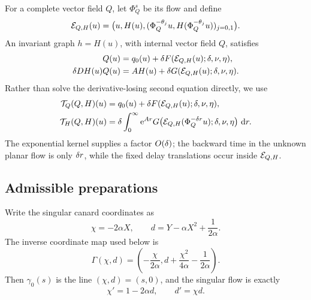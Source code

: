 For a complete vector field \(Q\), let \(\Phi_Q^s\) be its flow and define
\begin{equation}
\label{eq:graph-evaluation}
 \mathcal E_{Q,H}(u)=\bigl(u,H(u),
   (\Phi_Q^{-\theta_j}u,H(\Phi_Q^{-\theta_j}u))_{j=0,1}\bigr).
\end{equation}
An invariant graph \(h=H(u)\), with internal vector field \(Q\), satisfies
\begin{equation}
\label{eq:graph-invariance}
\begin{aligned}
 Q(u)&=q_0(u)+\delta F(\mathcal E_{Q,H}(u);\delta,\nu,\eta),\\
 \delta DH(u)Q(u)&=AH(u)+\delta G(\mathcal E_{Q,H}(u);\delta,\nu,\eta).
\end{aligned}
\end{equation}
Rather than solve the derivative-losing second equation directly, we use
\begin{equation}
\label{eq:graph-transform}
\begin{aligned}
 \mathcal T_Q(Q,H)(u)&=q_0(u)+\delta F(\mathcal E_{Q,H}(u);\delta,\nu,\eta),\\
 \mathcal T_H(Q,H)(u)&=\delta\int_0^\infty \mathrm e^{Ar}
 G\bigl(\mathcal E_{Q,H}(\Phi_Q^{-\delta r}u);\delta,\nu,\eta\bigr)\,\,\mathrm d r.
\end{aligned}
\end{equation}
The exponential kernel supplies a factor \(O(\delta)\); the backward time in
the unknown planar flow is only \(\delta r\), while the fixed delay
translations occur inside \(\mathcal E_{Q,H}\).

\subsection{Admissible preparations}

Write the singular canard coordinates as
\begin{equation}
\label{eq:canard-coordinates}
 \chi=-2\alpha X,
 \qquad d=Y-\alpha X^2+\frac1{2\alpha}.
\end{equation}
The inverse coordinate map used below is
\begin{equation}
\label{eq:Gamma-coordinate-map}
 \Gamma(\chi,d)
 =\left(-\frac{\chi}{2\alpha},
 d+\frac{\chi^2}{4\alpha}-\frac1{2\alpha}\right).
\end{equation}
Then \(\gamma_0(s)\) is the line \((\chi,d)=(s,0)\), and the singular
flow is exactly
\begin{equation}
\label{eq:canard-coordinate-flow}
 \chi'=1-2\alpha d,
 \qquad d'=\chi d.
\end{equation}

